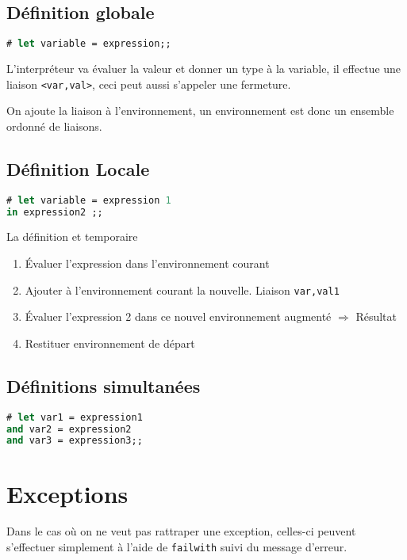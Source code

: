 \subsection{Définition globale}
\begin{lstlisting}[language=Caml, caption=Définition de variable]
# let variable = expression;;
\end{lstlisting}
L'interpréteur va évaluer la valeur et donner un type à la variable, il effectue une liaison \texttt{<var,val>}, ceci peut aussi s'appeler une
fermeture.

On ajoute la liaison à l'environnement, un environnement est donc un ensemble ordonné de liaisons.
\subsection{Définition Locale}
\begin{lstlisting}[language=Caml, caption=Définition de variable]
# let variable = expression 1
in expression2 ;;
\end{lstlisting}
La définition et temporaire
\begin{enumerate}
	\item Évaluer l'expression dans l'environnement courant
	\item Ajouter à l'environnement courant la nouvelle. Liaison \texttt{var,val1}
	\item Évaluer l'expression 2 dans ce nouvel environnement augmenté $\Rightarrow$ Résultat
	\item Restituer environnement de départ
\end{enumerate}

\subsection{Définitions simultanées}
\begin{lstlisting}[language=Caml, caption=Définition de variable]
# let var1 = expression1 
and var2 = expression2
and var3 = expression3;;
\end{lstlisting}

\section{Exceptions}
Dans le cas où on ne veut pas rattraper une exception, celles-ci peuvent s'effectuer simplement à l'aide de \texttt{failwith} suivi du message
d'erreur.

